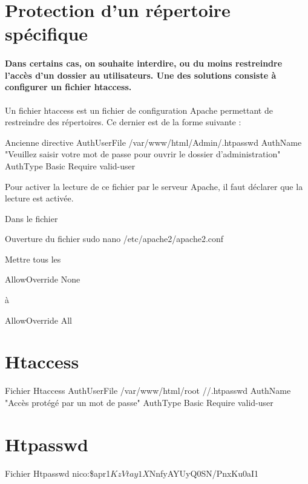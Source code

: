 \section{Protection d’un répertoire spécifique}

\paragraph{
Dans certains cas, on souhaite interdire, ou du moins restreindre l’accès d’un dossier au utilisateurs.
Une des solutions consiste à configurer un fichier htaccess. \newline
}
Un fichier htaccess est un fichier de configuration Apache permettant de restreindre des répertoires.
Ce dernier est de la forme suivante : \newline 


\begin{Bash}{Ancienne directive}
AuthUserFile /var/www/html/Admin/.htpasswd
AuthName "Veuillez saisir votre mot de passe pour ouvrir le dossier d'administration"
AuthType Basic
Require valid-user
\end{Bash}

Pour activer la lecture de ce fichier par le serveur Apache, il faut déclarer que la lecture est activée.

Dans le fichier 
\begin{Bash}{Ouverture du fichier}
sudo nano /etc/apache2/apache2.conf
\end{Bash}

Mettre tous les 
\begin{Bash}{\protect }
AllowOverride None
\end{Bash}
à 
\begin{Bash}{\protect }
AllowOverride All
\end{Bash}


\section{Htaccess}

\begin{Bash}{Fichier Htaccess}
AuthUserFile /var/www/html/root	//.htpasswd
AuthName "Accès protégé par un mot de passe"
AuthType Basic
Require valid-user
\end{Bash}

\section{Htpasswd}
\begin{Bash}{Fichier Htpasswd}
nico:\$apr1$KzVtay1X$NnfyAYUyQ0SN/PnxKu0aI1

\end{Bash}

